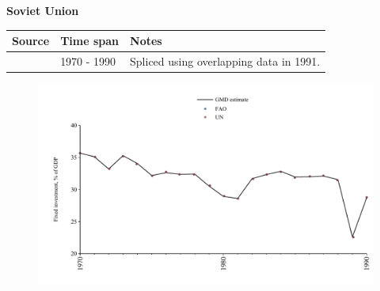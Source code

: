 \documentclass[12pt,a4paper,landscape]{article}
\begin{document}
\begin{adjustbox}{max totalsize={\paperwidth}{\paperheight},center}
\begin{minipage}[t][\textheight][t]{\textwidth}
\vspace*{0.5cm}
{}
\begin{center}
{\Large\bfseries Soviet Union}
\end{center}
\vspace{0.5cm}
\begin{table}[H]
\centering
\small
\begin{tabular}{|l|l|l|}
\hline
\textbf{Source} & \textbf{Time span} & \textbf{Notes} \\
\hline
\rowcolor{white}\cite{UN}& 1970 - 1990 &Spliced using overlapping data in 1991.\\
\hline
\end{tabular}
\end{table}
\begin{figure}[H]
\centering
\includegraphics[width=\textwidth,height=0.6\textheight,keepaspectratio]{graphs/SUN_finv_GDP.pdf}
\end{figure}
\end{minipage}
\end{adjustbox}
\end{document}
